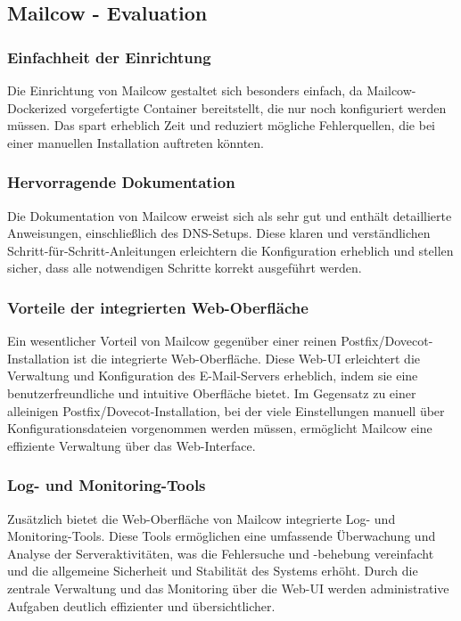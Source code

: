 \subsection{Mailcow - Evaluation}

\subsubsection{Einfachheit der Einrichtung}
Die Einrichtung von Mailcow gestaltet sich besonders einfach, da Mailcow-Dockerized vorgefertigte Container bereitstellt, die nur noch konfiguriert werden müssen. Das spart erheblich Zeit und reduziert mögliche Fehlerquellen, die bei einer manuellen Installation auftreten könnten.

\subsubsection{Hervorragende Dokumentation}
Die Dokumentation von Mailcow erweist sich als sehr gut und enthält detaillierte Anweisungen, einschließlich des DNS-Setups. Diese klaren und verständlichen Schritt-für-Schritt-Anleitungen erleichtern die Konfiguration erheblich und stellen sicher, dass alle notwendigen Schritte korrekt ausgeführt werden.

\subsubsection{Vorteile der integrierten Web-Oberfläche}
Ein wesentlicher Vorteil von Mailcow gegenüber einer reinen Postfix/Dovecot-Installation ist die integrierte Web-Oberfläche. Diese Web-UI erleichtert die Verwaltung und Konfiguration des E-Mail-Servers erheblich, indem sie eine benutzerfreundliche und intuitive Oberfläche bietet. Im Gegensatz zu einer alleinigen Postfix/Dovecot-Installation, bei der viele Einstellungen manuell über Konfigurationsdateien vorgenommen werden müssen, ermöglicht Mailcow eine effiziente Verwaltung über das Web-Interface.

\subsubsection{Log- und Monitoring-Tools}
Zusätzlich bietet die Web-Oberfläche von Mailcow integrierte Log- und Monitoring-Tools. Diese Tools ermöglichen eine umfassende Überwachung und Analyse der Serveraktivitäten, was die Fehlersuche und -behebung vereinfacht und die allgemeine Sicherheit und Stabilität des Systems erhöht. Durch die zentrale Verwaltung und das Monitoring über die Web-UI werden administrative Aufgaben deutlich effizienter und übersichtlicher.
